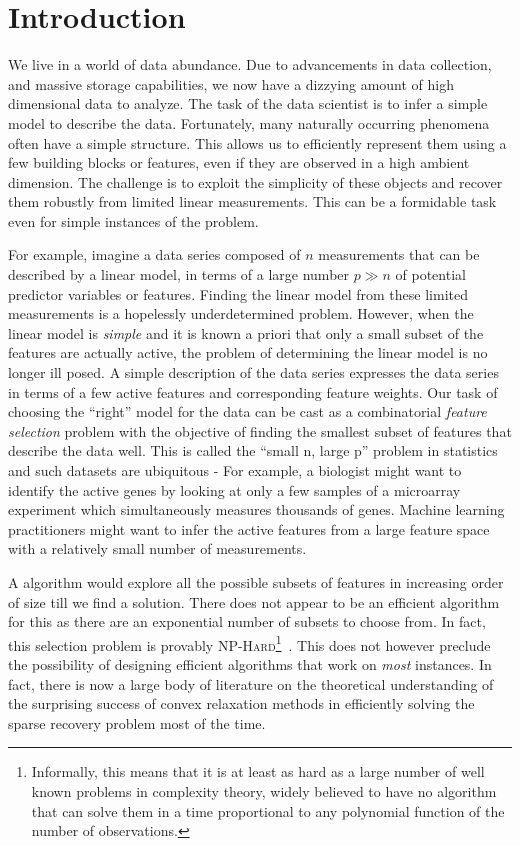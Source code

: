 \chapter{Introduction}

We live in a world of data abundance. Due to advancements in data collection,
and massive storage capabilities, we now have a dizzying amount of high
dimensional data to analyze. The task of the data scientist is to infer a simple
model to describe the data. Fortunately, many naturally occurring phenomena
often have a simple structure. This allows us to efficiently represent them
using a few building blocks or features, even if they are observed in a high
ambient dimension. The challenge is to exploit the simplicity of these objects
and recover them robustly from limited linear measurements. This can be a
formidable task even for simple instances of the problem.

For example, imagine a data series composed of $n$ measurements that can be
described by a linear model, in terms of a large number $p \gg n$ of potential
predictor variables or features. Finding the linear model from these limited
measurements is a hopelessly underdetermined problem. However, when the linear
model is \emph{simple} and it is known a priori that only a small subset of the
features are actually active, the problem of determining the linear model is no
longer ill posed. A simple description of the data series expresses the data
series in terms of a few active features and corresponding feature weights. Our
task of choosing the ``right'' model for the data can be cast as a combinatorial
\emph{feature selection} problem with the objective of finding the smallest
subset of features that describe the data well. This is called the ``small n,
large p'' problem in statistics and such datasets are ubiquitous - For example,
a biologist might want to identify the active genes by looking at only a few
samples of a microarray experiment which simultaneously measures thousands of
genes. Machine learning practitioners might want to infer the active features
from a large feature space with a relatively small number of measurements.

A \naive{} algorithm would explore all the possible subsets of features in
increasing order of size till we find a solution. There does not appear to be an
efficient algorithm for this as there are an exponential number of subsets to
choose from. In fact, this selection problem is provably
\textsc{NP-Hard}\footnote{Informally, this means that it is at least as hard as
a large number of well known problems in complexity theory, widely believed to
have no algorithm that can solve them in a time proportional to any polynomial
function of the number of observations.}~\cite{Natarajan95}. This does not
however preclude the possibility of designing efficient algorithms that work on
\emph{most} instances. In fact, there is now a large body of literature on the
theoretical understanding of the surprising success of convex relaxation methods
in efficiently solving the sparse recovery problem most of the time.

